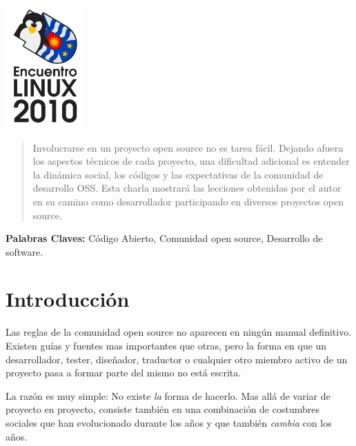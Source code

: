 \begin{minipage}{0.1in}
  \includegraphics[width=1.2in]{images/logo.png}
\end{minipage}
\hfill
\begin{minipage}{6in}
  \maketitle
\end{minipage}
\hfill
\begin{minipage}{7in}
\end{minipage}
  \thispagestyle{empty}

\begin{abstract}

  Involucrarse en un proyecto open source no es tarea fácil. Dejando afuera los
  aspectos técnicos de cada proyecto, una dificultad adicional es entender la
  dinámica social, los códigos y las expectativas de la comunidad de desarrollo
  OSS. Esta charla mostrará las lecciones obtenidas por el autor en su camino
  como desarrollador participando en diversos proyectos open source.

\end{abstract}

\textbf{Palabras Claves:} Código Abierto, Comunidad open source, Desarrollo de
software.

\section*{Introducción}

Las reglas de la comunidad open source no aparecen en ningún manual
definitivo. Existen guías y fuentes mas importantes que otras, pero la forma en
que un desarrollador, tester, diseñador, traductor o cualquier otro miembro
activo de un proyecto pasa a formar parte del mismo no está escrita.

La razón es muy simple: No existe \emph{la} forma de hacerlo. Mas allá de variar
de proyecto en proyecto, consiste también en una combinación de costumbres
sociales que han evolucionado durante los años y que también \emph{cambia} con
los años.


